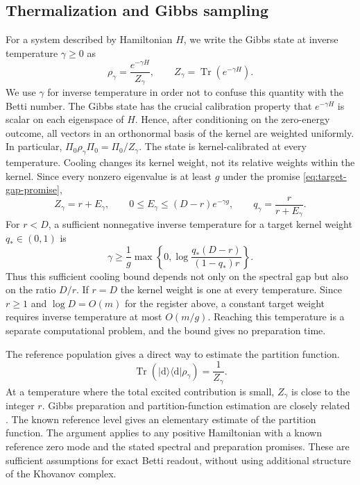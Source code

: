 \documentclass[a4paper,onecolumn,unpublished]{quantumarticle}
\theoremstyle{plain}
\theoremstyle{definition}
\theoremstyle{definition}
\numberwithin{equation}{section}
\begin{document}
\subsection{Thermalization and Gibbs sampling}
\label{sec:thermalization}

For a system described by Hamiltonian $H$, we write the Gibbs state
at inverse temperature $\gamma\ge0$ as
\begin{equation}\label{eq:gibbs_state}
 \rho_\gamma=\frac{e^{-\gamma H}}{Z_\gamma},
 \qquad Z_\gamma=\operatorname{Tr}(e^{-\gamma H}).
\end{equation}
We use $\gamma$ for inverse temperature in order not to confuse this
quantity with the Betti number. The Gibbs state has the crucial
calibration property that $e^{-\gamma H}$ is scalar on each eigenspace
of $H$. Hence, after conditioning on the zero-energy outcome, all
vectors in an orthonormal basis of the kernel are weighted
uniformly. In particular, $\Pi_0\rho_\gamma\Pi_0=\Pi_0/Z_\gamma$.
The state is kernel-calibrated at every temperature. Cooling changes
its kernel weight, not its relative weights within the kernel.
Since every nonzero eigenvalue is at least $g$ under the promise
\cref{eq:target-gap-promise},
\begin{equation}\label{eq:gibbs-tail}
 Z_\gamma=r+E_\gamma,\qquad
 0\le E_\gamma\le(D-r)e^{-\gamma g},\qquad
 q_\gamma=\frac{r}{r+E_\gamma}.
\end{equation}
For $r<D$, a sufficient nonnegative inverse temperature for
a target kernel weight $q_*\in(0,1)$ is
\begin{equation}\label{eq:gamma-bound}
 \gamma\ge\frac1g\max\!\left\{0,
       \log\frac{q_*(D-r)}{(1-q_*)r}\right\}.
\end{equation}
Thus this sufficient cooling bound depends not only on the spectral
gap but also on the ratio $D/r$.
If $r=D$ the kernel weight is one at every temperature.
Since $r\ge1$ and $\log D=O(m)$ for the register above, a
constant target weight requires inverse temperature at most
$O(m/g)$. Reaching this temperature is a separate computational
problem, and the bound gives no preparation time.

The reference population gives a direct way to estimate the
partition function.
\begin{equation}\label{eq:reference-population}
 \operatorname{Tr}(|\mathrm d\rangle\!\langle\mathrm d|
                         \rho_\gamma)=\frac1{Z_\gamma}.
\end{equation}
At a temperature where the total excited contribution is small,
$Z_\gamma$ is close to the integer $r$.
Gibbs preparation and partition-function estimation are closely
related \cite{PoulinWocjan09}. The known reference level gives
an elementary estimate of the partition function.
The argument applies to any positive Hamiltonian with a known
reference zero mode and the stated spectral and preparation
promises. These are sufficient assumptions for exact Betti
readout, without using additional structure of the Khovanov complex.
\end{document}
